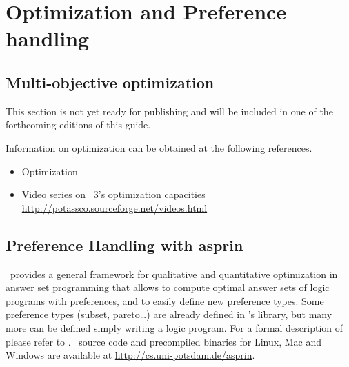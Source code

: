 
\section{Optimization and Preference handling}
\label{sec:prefopt}

\subsection{Multi-objective optimization}
\label{sec:oprimization}

This section is not yet ready for publishing
and will be included in one of the forthcoming editions of this guide.

Information on optimization %
can be obtained at the following references.

\begin{itemize}
\item Optimization \cite{gekakasc11b,gekakasc11c,gekasc11b,ankamasc12a}
\item Video series on \clasp~3's optimization capacities \url{http://potassco.sourceforge.net/videos.html}
\end{itemize}

\subsection{Preference Handling with asprin}

\asprin\ provides a general framework for qualitative and quantitative optimization in
answer set programming
that allows to compute optimal answer sets of logic programs with preferences, and     
to easily define new preference types.
Some preference types (subset, pareto\dots) are already defined in \asprin's library, 
but many more can be defined  simply writing a logic program.  
For a formal description of \asprin\, please refer to \cite{brderosc15a}. 
\asprin\ source code and precompiled binaries for Linux, Mac and Windows are available  
at \url{http://cs.uni-potsdam.de/asprin}.

% 
% 
% 

